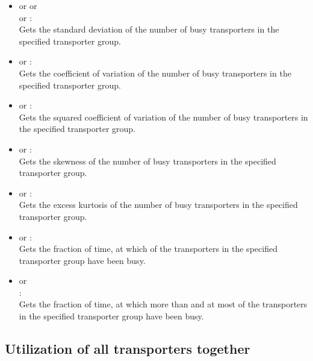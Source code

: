 \begin{itemize}
\item
{} or  or\\
 or :\\
Gets the standard deviation of the number of busy transporters in the specified transporter group.
  
\item
{} or :\\
Gets the coefficient of variation of the number of busy transporters in the specified transporter group.
  
\item
{} or :\\
Gets the squared coefficient of variation of the number of busy transporters in the specified transporter group.

\item
{} or :\\
Gets the skewness of the number of busy transporters in the specified transporter group.

\item
{} or :\\
Gets the excess kurtosis of the number of busy transporters in the specified transporter group.

\item
{} or :\\
Gets the fraction of time, at which  of the transporters in the specified transporter group have been busy.
  
\item
{} or\\
:\\
Gets the fraction of time, at which more than  and at most  of the transporters in the specified transporter group have been busy.

\end{itemize}



\subsection{Utilization of all transporters together}

